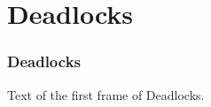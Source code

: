 \section{Deadlocks}

\begin{frame}
    \frametitle{Deadlocks}
    
    Text of the first frame of Deadlocks.

\end{frame}
